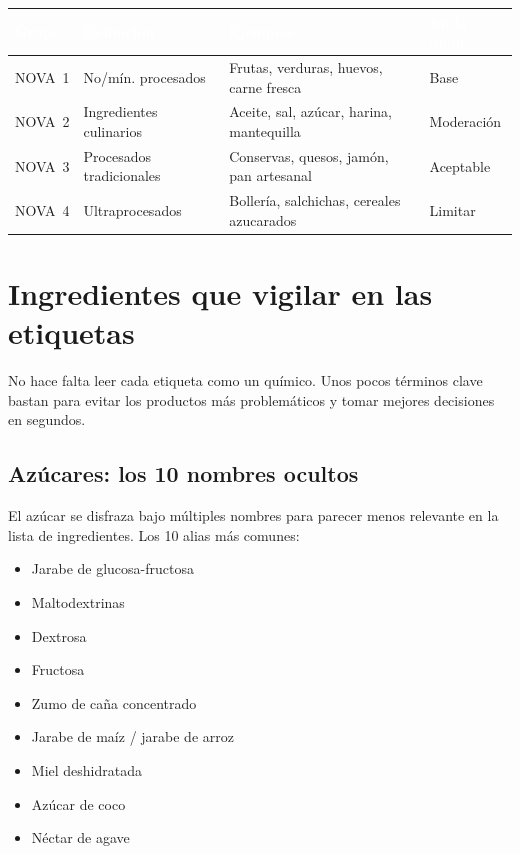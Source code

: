 \documentclass[a5paper,12pt,oneside,openany]{book}
\begin{document}
{\small
\begin{tabularx}{\textwidth}{|l|L|L|l|}
\hline
{}
  \textcolor{white}{\textbf{Grupo}}
  & \textcolor{white}{\textbf{Definición}}
  & \textcolor{white}{\textbf{Ejemplos}}
  & \textcolor{white}{\textbf{En la dieta}} \\
\hline
NOVA~1 & No/mín. procesados & Frutas, verduras, huevos, carne fresca & Base \\
\hline
NOVA~2 & Ingredientes culinarios & Aceite, sal, azúcar, harina, mantequilla & Moderación \\
\hline
NOVA~3 & Procesados tradicionales & Conservas, quesos, jamón, pan artesanal & Aceptable \\
\hline
NOVA~4 & Ultraprocesados & Bollería, salchichas, cereales azucarados & Limitar \\
\hline
\end{tabularx}
}

\chapter{Ingredientes que vigilar en las etiquetas}

No hace falta leer cada etiqueta como un químico. Unos pocos términos clave
bastan para evitar los productos más problemáticos y tomar mejores decisiones
en segundos.

\section{Azúcares: los 10 nombres ocultos}

El azúcar se disfraza bajo múltiples nombres para parecer menos relevante en
la lista de ingredientes. Los 10 alias más comunes:

\begin{itemize}
  \item Jarabe de glucosa-fructosa
  \item Maltodextrinas
  \item Dextrosa
  \item Fructosa
  \item Zumo de caña concentrado
  \item Jarabe de maíz / jarabe de arroz
  \item Miel deshidratada
  \item Azúcar de coco
  \item Néctar de agave
\end{itemize}
\end{document}
